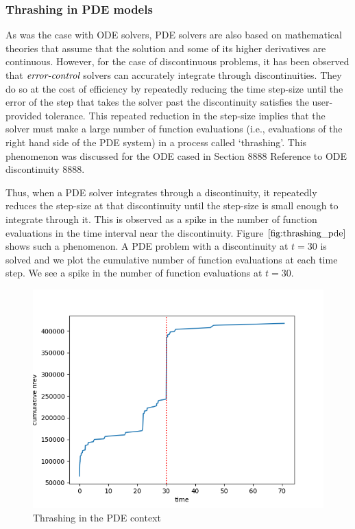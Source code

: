 \documentclass{article}
\begin{document}
\subsubsection{Thrashing in PDE models}
\label{subsection:pde_thrashing}
As was the case with ODE solvers, PDE solvers are also based on mathematical theories that assume that the solution and some of its higher derivatives are continuous. However, for the case of discontinuous problems, it has been observed that $\emph{error-control}$ solvers can accurately integrate through discontinuities. They do so at the cost of efficiency by repeatedly reducing the time step-size until the error of the step that takes the solver past the discontinuity satisfies the user-provided tolerance. This repeated reduction in the step-size implies that the solver must make a large number of function evaluations (i.e., evaluations of the right hand side of the PDE system) in a process called `thrashing'. This phenomenon was discussed for the ODE cased in Section 8888 Reference to ODE discontinuity 8888.

Thus, when a PDE solver integrates through a discontinuity, it repeatedly reduces the step-size at that discontinuity until the step-size is small enough to integrate through it. This is observed as a spike in the number of function evaluations in the time interval near the discontinuity. Figure $\ref{fig:thrashing_pde}$ shows such a phenomenon. A PDE problem with a discontinuity at $t=30$ is solved and we plot the cumulative number of function evaluations at each time step. We see a spike in the number of function evaluations at $t=30$.
\begin{figure}[H]
\centering
\includegraphics[width=0.7\linewidth]{./figures/pde_thrashing}
\caption{Thrashing in the PDE context}
\label{fig:thrashing_pde}
\end{figure}
\end{document}
